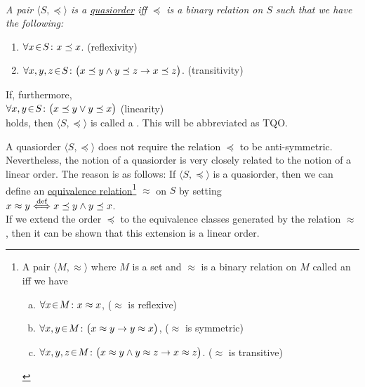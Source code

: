 \begin{Definition}[Quasiorder]  \hspace*{\fill} \\
{\em
  A pair $\langle S, \preceq\rangle$ is a \href{https://en.wikipedia.org/wiki/Preorder}{quasiorder}   iff $\preceq$ is a 
  binary relation on $S$ such that we have the following:
  \begin{enumerate}
  \item $\forall x \!\in\! S\colon x \preceq x$. \hspace*{\fill} (reflexivity)
  \item $\forall x, y, z \!\in\! S \colon \bigl(x \preceq y \wedge y \preceq z \rightarrow x \preceq z\bigr)$. 
         \hspace*{\fill} (transitivity)
  \end{enumerate}
  If, furthermore,
  \\[0.2cm]
  \hspace*{1.3cm}
  $\forall x, y \!\in\! S \colon \bigl(x \preceq y \vee y \preceq x\bigr)$ \hspace*{\fill} (linearity) 
  \\[0.2cm]
  holds, then $\langle S, \preceq \rangle$ is called a .  This will be
  abbreviated as \textsc{TQO}.
}
\end{Definition}
A quasiorder $\langle S, \preceq \rangle$ does not require the relation $\preceq$ to be
anti-symmetric.  Nevertheless, the notion of a quasiorder is very closely related to the notion of a
linear order.  The reason is as follows:  If $\langle S, \preceq \rangle$ is a quasiorder, then we can define an
\href{https://en.wikipedia.org/wiki/Equivalence_relation}{equivalence relation}\footnote{
  A pair $\langle M, \approx \rangle$ where $M$ is a set and $\approx$ is a binary relation on $M$ called an
   iff we have
  \begin{enumerate}[(a)]
  \item $\forall x \!\in\! M \colon x \approx x$,                      \hspace*{\fill} ($\approx$ is reflexive)
  \item $\forall x, y \!\in\! M \colon \bigl(x \approx y \rightarrow y \approx x\bigr)$,
        \hspace*{\fill} ($\approx$ is symmetric)
  \item $\forall x, y, z \!\in\! M \colon \bigl(x \approx y \wedge y \approx z \rightarrow x \approx z\bigr)$.
        \hspace*{\fill} ($\approx$ is transitive)
\end{enumerate}
}
$\approx$ on $S$ by setting
\\[0.2cm]
\hspace*{1.3cm}
$x \approx y \stackrel{\mbox{\scriptsize def}}{\Longleftrightarrow} x \preceq y \wedge y \preceq x$. 
\\[0.2cm]
If we extend the order $\preceq$ to the equivalence classes generated by the relation $\approx$,
then it can be shown that this extension is a linear order.
\vspace*{0.3cm}

